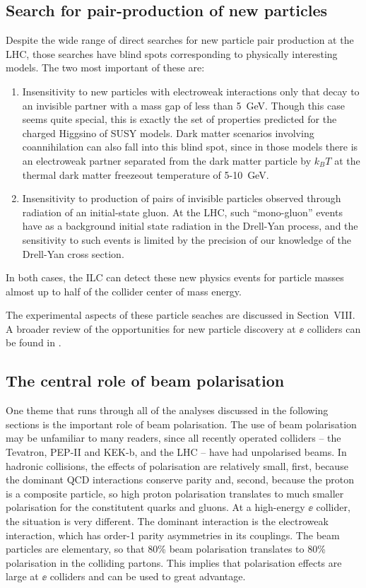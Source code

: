      
\subsection{Search for pair-production of new particles}

Despite the wide range of direct searches for new particle pair production at the LHC, 
those searches have blind spots corresponding to physically interesting models.  The two most important of these are:
\begin{enumerate}
\item  Insensitivity to new particles with electroweak interactions only that decay to an invisible partner with a mass gap of less than 5~GeV.   Though this case seems quite special, this is exactly the set of properties predicted for the charged Higgsino of SUSY models.  Dark matter scenarios involving coannihilation can also fall into this blind spot, since in those models there is an electroweak partner separated from the dark matter particle by $k_B T$ at the thermal dark matter freezeout temperature of 5-10~GeV.
\item Insensitivity to production of pairs of invisible particles observed through radiation of an initial-state gluon.   At the LHC, such ``mono-gluon'' events have as a background initial state radiation in the Drell-Yan process, and the sensitivity to such events is limited by the precision of our knowledge of the Drell-Yan cross section.
\end{enumerate}
In both cases, the ILC can detect these new physics events for particle masses almost up to half of  the collider center of mass energy.

The experimental aspects of these particle seaches are discussed in Section~VIII.  A broader review of the opportunities for new particle discovery at $\ee$ colliders can be found in \cite{Fujii:2017ekh}.

\subsection{The central role of beam polarisation}
\label{subsec:beampol}

One theme that runs through all of the analyses discussed in the following sections is the  important role of beam polarisation.   The use of beam polarisation may be unfamiliar to many readers, since all recently operated colliders -- the Tevatron, PEP-II and KEK-b, and the LHC -- have had unpolarised beams.   In hadronic 
collisions, the effects of polarisation are relatively small, first, because the dominant QCD interactions conserve parity and, second, because the proton is a composite particle, so high proton polarisation translates to much smaller polarisation for the constitutent quarks and gluons.   At a high-energy $\ee$ collider, the situation is very different.  The dominant interaction is the electroweak interaction, which has 
order-1 parity asymmetries in its couplings.  The beam particles are elementary, so that 80\% beam polarisation translates to 80\% polarisation in the colliding partons.
This implies  that polarisation effects are large at $\ee$  colliders and can be used to great advantage.   

